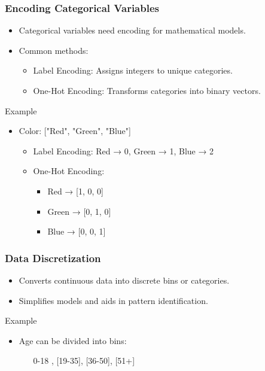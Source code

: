 \documentclass[aspectratio=169]{beamer}
\begin{document}
\begin{frame}[fragile]
    \frametitle{Encoding Categorical Variables}
    \begin{itemize}
        \item Categorical variables need encoding for mathematical models.
        \item Common methods:
        \begin{itemize}
            \item Label Encoding: Assigns integers to unique categories.
            \item One-Hot Encoding: Transforms categories into binary vectors.
        \end{itemize}
    \end{itemize}
    \begin{block}{Example}
        \begin{itemize}
            \item Color: ["Red", "Green", "Blue"]
            \begin{itemize}
                \item Label Encoding: Red → 0, Green → 1, Blue → 2
                \item One-Hot Encoding: 
                \begin{itemize}
                    \item Red → [1, 0, 0]
                    \item Green → [0, 1, 0]
                    \item Blue → [0, 0, 1]
                \end{itemize}
            \end{itemize}
        \end{itemize}
    \end{block}
\end{frame}

\begin{frame}[fragile]
    \frametitle{Data Discretization}
    \begin{itemize}
        \item Converts continuous data into discrete bins or categories.
        \item Simplifies models and aids in pattern identification.
    \end{itemize}
    \begin{block}{Example}
        \begin{itemize}
            \item Age can be divided into bins:
            \begin{itemize}
                \item [0-18], [19-35], [36-50], [51+]
            \end{itemize}
        \end{itemize}
    \end{block}
\end{frame}
\end{document}
